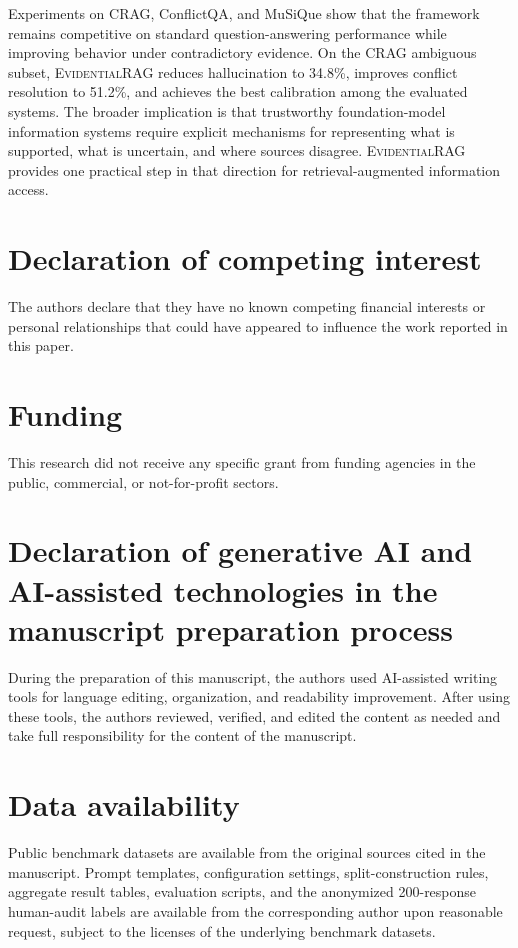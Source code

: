 \documentclass[preprint,12pt,authoryear,nopreprintline]{elsarticle}
\newcommand{\ERAG}{\textsc{EvidentialRAG}}
\begin{document}
Experiments on CRAG, ConflictQA, and MuSiQue show that the framework remains competitive on standard question-answering performance while improving behavior under contradictory evidence. On the CRAG ambiguous subset, \ERAG{} reduces hallucination to 34.8\%, improves conflict resolution to 51.2\%, and achieves the best calibration among the evaluated systems. The broader implication is that trustworthy foundation-model information systems require explicit mechanisms for representing what is supported, what is uncertain, and where sources disagree. \ERAG{} provides one practical step in that direction for retrieval-augmented information access.


\section*{Declaration of competing interest}

The authors declare that they have no known competing financial interests or personal relationships that could have appeared to influence the work reported in this paper.

\section*{Funding}

This research did not receive any specific grant from funding agencies in the public, commercial, or not-for-profit sectors.

\section*{Declaration of generative AI and AI-assisted technologies in the manuscript preparation process}

During the preparation of this manuscript, the authors used AI-assisted writing tools for language editing, organization, and readability improvement. After using these tools, the authors reviewed, verified, and edited the content as needed and take full responsibility for the content of the manuscript.

\section*{Data availability}

Public benchmark datasets are available from the original sources cited in the manuscript. Prompt templates, configuration settings, split-construction rules, aggregate result tables, evaluation scripts, and the anonymized 200-response human-audit labels are available from the corresponding author upon reasonable request, subject to the licenses of the underlying benchmark datasets.
\end{document}
